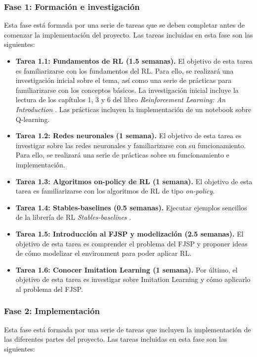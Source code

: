 \subsubsection{Fase 1: Formación e investigación}
Esta fase está formada por una serie de tareas que se deben completar antes de comenzar
la implementación del proyecto. Las tareas incluidas en esta fase son las siguientes:

\begin{itemize}
    \item \textbf{Tarea 1.1: Fundamentos de RL (1.5 semanas).} El objetivo de esta tarea es
    familiarizarse con los fundamentos del RL. Para ello, se realizará una investigación
    inicial sobre el tema, así como una serie de prácticas para familiarizarse con los
    conceptos básicos. La investigación inicial incluye la lectura de los capítulos 1, 3 y 6
    del libro \textit{Reinforcement Learning: An Introduction} \cite{sutton2018reinforcement}.
    Las prácticas incluyen la implementación de un notebook sobre Q-learning.
    \item \textbf{Tarea 1.2: Redes neuronales (1 semana).} El objetivo de esta tarea es
    investigar sobre las redes neuronales y familiarizarse con su funcionamiento. Para ello,
    se realizará una serie de prácticas sobre su funcionamiento e implementación.
    \item \textbf{Tarea 1.3: Algoritmos on-policy de RL (1 semana).} El objetivo de esta tarea
    es familiarizarse con los algoritmos de RL de tipo \textit{on-policy}.
    \item \textbf{Tarea 1.4: Stables-baselines (0.5 semanas).} Ejecutar ejemplos sencillos
    de la librería de RL \textit{Stables-baselines} \cite{stable-baselines3}.
    \item \textbf{Tarea 1.5: Introducción al FJSP y modelización (2.5 semanas).} El
    objetivo de esta tarea es comprender el problema del FJSP y proponer ideas de cómo 
    modelizar el environment para poder aplicar RL.
    \item \textbf{Tarea 1.6: Conocer Imitation Learning (1 semana).} Por último, el objetivo
    de esta tarea es investigar sobre Imitation Learning y cómo aplicarlo al problema del
    FJSP.
\end{itemize}

\subsubsection{Fase 2: Implementación}
Esta fase está formada por una serie de tareas que incluyen la implementación de las diferentes
partes del proyecto. Las tareas incluidas en esta fase son las siguientes:


